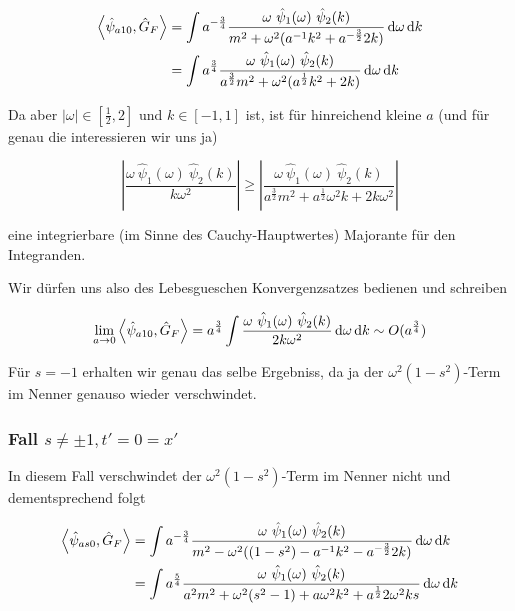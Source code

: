 \begin{align*}
    \left< \hat\psi_{a10}, \hat G_F \right>
    &=
    \int a^{-\frac{3}{4}} \frac{
        \omega ~\hat \psi_1(\omega) ~\hat \psi_2(k)
    }
    {
        m^2+\omega^2 (a^{-1}k^2 + a^{-\frac{3}{2}}2 k )
    }
    \mathop{}\!\mathrm{d} \omega \mathop{}\!\mathrm{d} k \\
    &=
    \int a^{\frac{3}{4}} \frac{
        \omega ~\hat \psi_1(\omega) ~\hat \psi_2(k)
    }
    {
        a^\frac{3}{2} m^2+\omega^2 (a^\frac{1}{2}k^2 + 2 k )
    }
    \mathop{}\!\mathrm{d} \omega \mathop{}\!\mathrm{d} k
\end{align*}

Da aber $|\omega| \in [\frac{1}{2},2]$ und $k \in [-1,1]$ ist, ist für hinreichend
kleine $a$ (und für genau die interessieren wir uns ja)

\begin{equation*}
    \left|
        \frac{\omega ~\hat \psi_1(\omega) ~\hat \psi_2(k)}{k \omega^2}
    \right|
    \geq
    \left|
        \frac{\omega ~\hat \psi_1(\omega) ~\hat \psi_2(k)}
        {a^\frac{3}{2}m^2+a^\frac{1}{2}\omega^2 k+2k \omega^2}
    \right|
\end{equation*}

eine integrierbare (im Sinne des Cauchy-Hauptwertes) Majorante für den Integranden.


Wir dürfen uns also des Lebesgueschen Konvergenzsatzes bedienen und schreiben

\begin{equation}
    \lim_{a \rightarrow 0} \left< \hat\psi_{a10}, \hat G_F \right> =
    a^\frac{3}{4} \int \frac{
    \omega ~\hat \psi_1(\omega) ~\hat \psi_2(k)
    }
    {
    2k \omega^2
    }
    \mathop{}\!\mathrm{d} \omega \mathop{}\!\mathrm{d} k
    \sim O(a^\frac{3}{4})
\end{equation}

Für $s = -1$ erhalten wir genau das selbe Ergebniss, da ja der $\omega^2 (1-s^2)$-Term
im Nenner genauso wieder verschwindet.

\subsubsection*{Fall $s \neq \pm 1, t' = 0 = x'$}
In diesem Fall verschwindet der $\omega^2 (1-s^2)$-Term im Nenner nicht und
dementsprechend folgt

\begin{align*}
    \left< \hat\psi_{as0}, \hat G_F \right>
    &=
    \int a^{-\frac{3}{4}} \frac{
        \omega ~\hat \psi_1(\omega) ~\hat \psi_2(k)
    }
    {
        m^2-\omega^2 ((1-s^2) - a^{-1}k^2 - a^{-\frac{3}{2}}2 k )
    }
    \mathop{}\!\mathrm{d} \omega \mathop{}\!\mathrm{d} k \\
    &=
    \int a^{\frac{5}{4}} \frac{
        \omega ~\hat \psi_1(\omega) ~\hat \psi_2(k)
    }
    {
        a^2 m^2+\omega^2 (s^2-1) + a \omega^2 k^2 + a^\frac{1}{2}2 \omega^2 k s
    }
    \mathop{}\!\mathrm{d} \omega \mathop{}\!\mathrm{d} k
\end{align*}

